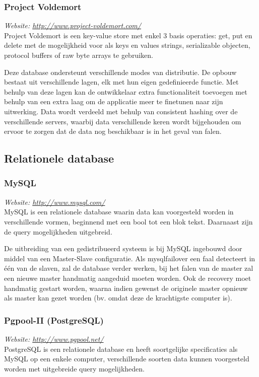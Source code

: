 \subsubsection{Project Voldemort}
\textit{Website: \url{http://www.project-voldemort.com/}}\\
Project Voldemort is een key-value store met enkel 3 basis operaties: get, put en delete met de mogelijkheid voor als keys en values strings, serializable objecten, protocol buffers of raw byte arrays te gebruiken. 

Deze database ondersteunt verschillende modes van distributie. De opbouw bestaat uit verschillende lagen, elk met hun eigen gedefinieerde functie. Met behulp van deze lagen kan de ontwikkelaar extra functionaliteit toevoegen met behulp van een extra laag om de applicatie meer te finetunen naar zijn uitwerking. 
Data wordt verdeeld met behulp van consistent hashing over de verschillende servers, waarbij data verschillende keren wordt bijgehouden om ervoor te zorgen dat de data nog beschikbaar is in het geval van falen. 

\subsection{Relationele database}
\subsubsection{MySQL}
\textit{Website: \url{http://www.mysql.com/}}\\
MySQL is een relationele database waarin data kan voorgesteld worden in verschillende vormen, beginnend met een bool tot een blok tekst. Daarnaast zijn de query mogelijkheden uitgebreid. 

De uitbreiding van een gedistribueerd systeem is bij MySQL ingebouwd door middel van een Master-Slave configuratie. Als mysqlfailover een faal detecteert in één van de slaven, zal de database verder werken, bij het falen van de master zal een nieuwe master handmatig aangeduid moeten worden. Ook de recovery moet handmatig gestart worden, waarna indien gewenst de originele master opnieuw als master kan gezet worden (bv. omdat deze de krachtigste computer is). 

\subsubsection{Pgpool-II (PostgreSQL)}
\textit{Website: \url{http://www.pgpool.net/}}\\
PostgreSQL is een relationele database en heeft soortgelijke specificaties als MySQL op een enkele computer, verschillende soorten data kunnen voorgesteld worden met uitgebreide query mogelijkheden. 

